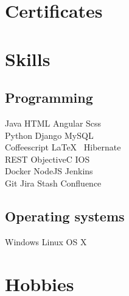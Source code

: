 \documentclass[]{deedy-resume-openfont}
\begin{document}
%
%



%
%

\begin{minipage}[t]{0.33\textwidth} 	
	


\section{Certificates}
\sectionsep



\section{Skills}
\subsection{Programming}
Java \textbullet{}   HTML \textbullet{} Angular \textbullet{} Scss \\
Python \textbullet{} Django \textbullet{} MySQL \\ 
Coffeescript \textbullet{} \LaTeX\ \textbullet{} Hibernate\\ 
REST \textbullet{} ObjectiveC \textbullet{} IOS \\ 
Docker \textbullet{} NodeJS \textbullet{} Jenkins \\
Git \textbullet{} Jira \textbullet{} Stash \textbullet{} Confluence
\sectionsep

\subsection{Operating systems}
Windows \textbullet{} Linux \textbullet{} OS X 
\sectionsep

\section{Hobbies}
\\
\\
\\
\\
\sectionsep



\end{minipage}
\end{document}
